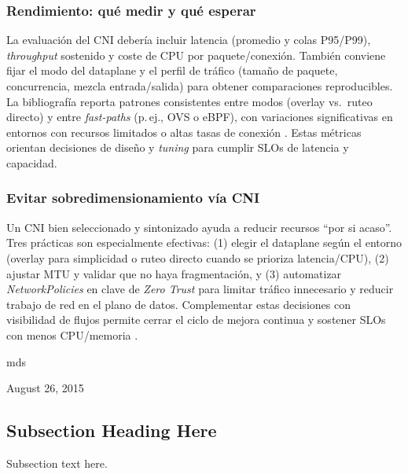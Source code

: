 \documentclass[journal]{IEEEtran}
\begin{document}
\subsubsection{Rendimiento: qué medir y qué esperar}
La evaluación del CNI debería incluir latencia (promedio y colas P95/P99), \emph{throughput} sostenido y coste de CPU por paquete/conexión. También conviene fijar el modo del dataplane y el perfil de tráfico (tamaño de paquete, concurrencia, mezcla entrada/salida) para obtener comparaciones reproducibles. La bibliografía reporta patrones consistentes entre modos (overlay vs.\ ruteo directo) y entre \emph{fast-paths} (p.\,ej., OVS o eBPF), con variaciones significativas en entornos con recursos limitados o altas tasas de conexión \cite{ref7,ref8,ref9,ref11,ref22,ref27}. Estas métricas orientan decisiones de diseño y \emph{tuning} para cumplir SLOs de latencia y capacidad.

\subsubsection{Evitar sobredimensionamiento vía CNI}
Un CNI bien seleccionado y sintonizado ayuda a reducir recursos “por si acaso”. Tres prácticas son especialmente efectivas: (1) elegir el dataplane según el entorno (overlay para simplicidad o ruteo directo cuando se prioriza latencia/CPU), (2) ajustar MTU y validar que no haya fragmentación, y (3) automatizar \emph{NetworkPolicies} en clave de \emph{Zero Trust} para limitar tráfico innecesario y reducir trabajo de red en el plano de datos. Complementar estas decisiones con visibilidad de flujos permite cerrar el ciclo de mejora continua y sostener SLOs con menos CPU/memoria \cite{ref7,ref8,ref12,ref23,ref24,ref25}.


% 

\hfill mds
 
\hfill August 26, 2015

\subsection{Subsection Heading Here}
Subsection text here.
\end{document}
